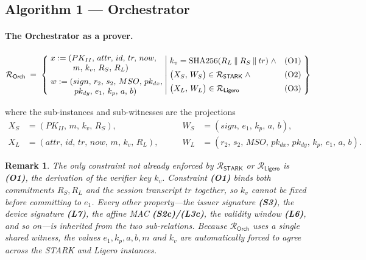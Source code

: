 \documentclass[binding=0.6cm,oneside,noexaminfo]{sapthesis}
\newcommand{\concat}{\mathbin{\|}}
\newcommand{\SHA}{\mathrm{SHA256}}
\newcommand{\Rel}[1]{\mathcal{R}_{#1}}
\newcommand{\RelSTARK}{\Rel{\mathsf{STARK}}}
\newcommand{\RelLigero}{\Rel{\mathsf{Ligero}}}
\newcommand{\RelOrch}{\Rel{\mathsf{Orch}}}
\newtheorem{remark}{Remark}
\begin{document}
\subsection{Algorithm 1 --- Orchestrator}
\label{sec:orchestrator}

\paragraph{The Orchestrator as a prover.} 

\begin{mdframed}[style=relationbox]
{\small
\[
\RelOrch \;=\; \left\{\;
\begin{array}{@{}l@{}}
x := (PK_{II},\, attr,\, id,\, tr,\, now, \\
\phantom{x := (}\, m,\, k_v,\, R_S,\, R_L) \\[5pt]
w := (sign,\, r_2,\, s_2,\, MSO,\, pk_{dx}, \\
\phantom{w := (}\, pk_{dy},\, e_1,\, k_p,\, a,\, b)
\end{array}
\;\middle|\;
\begin{array}{@{}l@{\quad}r@{}}
k_v = \SHA(R_L \concat R_S \concat tr) \;\wedge & \text{(O1)} \\[5pt]
\bigl(X_S,\, W_S\bigr) \in \RelSTARK \;\wedge & \text{(O2)} \\[5pt]
\bigl(X_L,\, W_L\bigr) \in \RelLigero & \text{(O3)}
\end{array}
\;\right\}
\]
}
\end{mdframed}

\noindent where the sub-instances and sub-witnesses are the projections
\[
\begin{aligned}
X_S &= (PK_{II},\, m,\, k_v,\, R_S), &\qquad
W_S &= (sign,\, e_1,\, k_p,\, a,\, b), \\
X_L &= (attr,\, id,\, tr,\, now,\, m,\, k_v,\, R_L), &\qquad
W_L &= (r_2,\, s_2,\, MSO,\, pk_{dx},\, pk_{dy},\, k_p,\, e_1,\, a,\, b).
\end{aligned}
\]

\begin{remark}
The only constraint not already enforced by $\RelSTARK$ or $\RelLigero$ is
\textbf{(O1)}, the derivation of the verifier key $k_v$. Constraint
\textbf{(O1)} binds \emph{both} commitments $R_S, R_L$ and the session
transcript $tr$ together, so $k_v$ cannot be fixed before committing to $e_1$.
Every other property---the issuer signature \textbf{(S3)}, the device
signature \textbf{(L7)}, the affine MAC \textbf{(S2c)/(L3c)}, the validity
window \textbf{(L6)}, and so on---is inherited from the two sub-relations.
Because $\RelOrch$ uses a single shared witness, the values $e_1, k_p, a, b, m$
and $k_v$ are automatically forced to agree across the STARK and Ligero
instances.
\end{remark}
\end{document}
